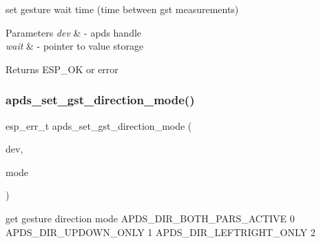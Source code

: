\begin{DoxyItemize}
\item set gesture wait time (time between gst measurements) 
\end{DoxyItemize}


\begin{DoxyParams}{Parameters}
{\em dev} & -\/ apds handle \\
\hline
{\em wait} & -\/ pointer to value storage \\
\hline
\end{DoxyParams}
\begin{DoxyReturn}{Returns}
E\+S\+P\+\_\+\+OK or error 
\end{DoxyReturn}
\mbox{\label{group__APDS9960__GestureFunctions_gabe89844ce55dddd3f1c94a62f625fcb7}} 
\subsubsection{\texorpdfstring{apds\+\_\+set\+\_\+gst\+\_\+direction\+\_\+mode()}{apds\_set\_gst\_direction\_mode()}}
{\footnotesize\ttfamily esp\+\_\+err\+\_\+t apds\+\_\+set\+\_\+gst\+\_\+direction\+\_\+mode (\begin{DoxyParamCaption}\item[{\hyperlink{structAPDS9960__Driver}{A\+P\+D\+S\+\_\+\+D\+EV}}]{dev,  }\item[{\hyperlink{vl53l0x__types_8h_aba7bc1797add20fe3efdf37ced1182c5}{uint8\+\_\+t} $\ast$}]{mode }\end{DoxyParamCaption})}




\begin{DoxyItemize}
\item get gesture direction mode A\+P\+D\+S\+\_\+\+D\+I\+R\+\_\+\+B\+O\+T\+H\+\_\+\+P\+A\+R\+S\+\_\+\+A\+C\+T\+I\+VE 0 A\+P\+D\+S\+\_\+\+D\+I\+R\+\_\+\+U\+P\+D\+O\+W\+N\+\_\+\+O\+N\+LY 1 A\+P\+D\+S\+\_\+\+D\+I\+R\+\_\+\+L\+E\+F\+T\+R\+I\+G\+H\+T\+\_\+\+O\+N\+LY 2 
\end{DoxyItemize}


